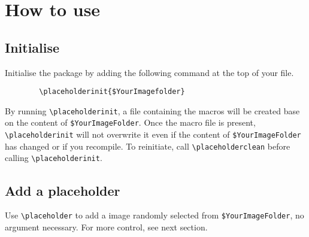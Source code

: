 \documentclass[12pt]{article}
\begin{document}
    \section{How to use}
    \subsection{Initialise}
    Initialise the package by adding the following command at the top of your file.
    \begin{lstlisting}        
        \placeholderinit{$YourImagefolder}
    \end{lstlisting}
    By running \lstinline{\placeholderinit}, a file containing the macros will be created base on the content of \lstinline{$YourImageFolder}. 
    Once the macro file is present, \lstinline{\placeholderinit} will not overwrite it even if the content of \lstinline{$YourImageFolder} has changed or if you recompile. 
    To reinitiate, call \lstinline{\placeholderclean} before calling \lstinline{\placeholderinit}.

    \subsection{Add a placeholder}
    Use \lstinline{\placeholder} to add a image randomly selected from \lstinline{$YourImageFolder}, no argument necessary. 
    For more control, see next section.
\end{document}
